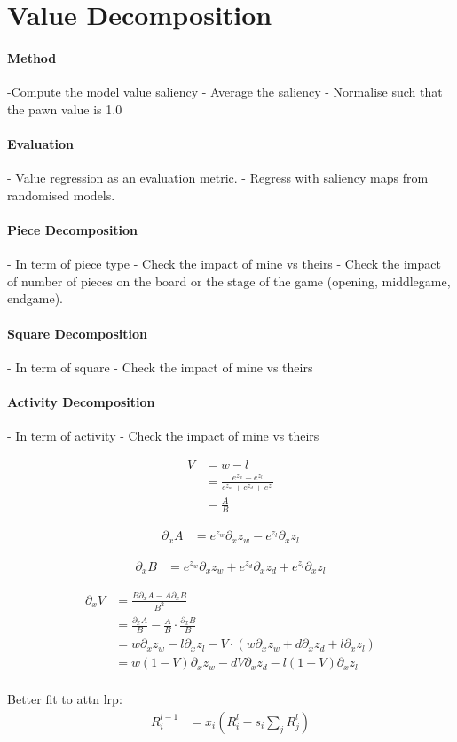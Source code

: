\section{Value Decomposition}
\paragraph{Method}
-Compute the model value saliency
- Average the saliency
- Normalise such that the pawn value is 1.0
\paragraph{Evaluation}
- Value regression as an evaluation metric.
- Regress with saliency maps from randomised models.
\paragraph{Piece Decomposition}
- In term of piece type
- Check the impact of mine vs theirs
- Check the impact of number of pieces on the board or the stage of the game (opening, middlegame, endgame).
\paragraph{Square Decomposition}
- In term of square
- Check the impact of mine vs theirs
\paragraph{Activity Decomposition}
- In term of activity
- Check the impact of mine vs theirs


\begin{align*}
    V &= w - l \\
        &= \frac{e^{z_w} - e^{z_l}}{e^{z_w} + e^{z_d} + e^{z_l}} \\
        &= \frac{A}{B}
\end{align*}

\begin{align*}
    \partial_x A &= e^{z_w} \partial_x z_w  - e^{z_l} \partial_x z_l
\end{align*}

\begin{align*}
    \partial_x B &= e^{z_w} \partial_x z_w + e^{z_d} \partial_x z_d + e^{z_l} \partial_x z_l
\end{align*}

\begin{align*}
    \partial_x V &= \frac{B\partial_x A - A \partial_x B}{B^2} \\
    &= \frac{\partial_x A }{B}-\frac{A}{B}\cdot\frac{\partial_x B}{B} \\
    &= w\partial_x z_w  - l\partial_x z_l -V\cdot
    (w \partial_x z_w + d \partial_x z_d + l \partial_x z_l) \\
    &= w(1-V) \partial_x z_w - dV \partial_x z_d - l (1+V) \partial_x z_l \\
\end{align*}


Better fit to attn lrp:
\begin{align*}
    R_i^{l-1} &= x_i(R_i^l-s_i\sum_j R_j^l)
\end{align*}
